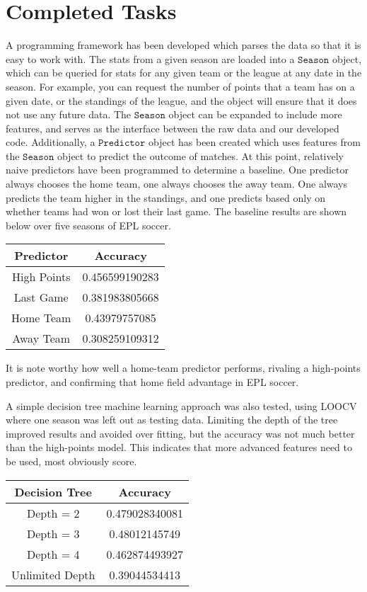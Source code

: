 \documentclass[conference]{IEEEtran}
\begin{document}
\section{Completed Tasks}
A programming framework has been developed which parses the data so that it is easy to work with. The stats from a given season are loaded into a $\mathtt{Season}$ object, which can be queried for stats for any given team or the league at any date in the season. For example, you can request the number of points that a team has on a given date, or the standings of the league, and the object will ensure that it does not use any future data. The $\mathtt{Season}$ object can be expanded to include more features, and serves as the interface between the raw data and our developed code. Additionally, a $\mathtt{Predictor}$ object has been created which uses features from the $\mathtt{Season}$ object to predict the outcome of matches. At this point, relatively naive predictors have been programmed to determine a baseline. One predictor always chooses the home team, one always chooses the away team. One always predicts the team higher in the standings, and one predicts based only on whether teams had won or lost their last game. The baseline results are shown below over five seasons of EPL soccer.

\begin{center}
  \begin{tabular}{@{} cc @{}}
    \hline
    Predictor & Accuracy \\ 
    \hline
High Points & 0.456599190283 \\ 
    Last Game & 0.381983805668\\ 
    Home Team & 0.43979757085 \\ 
    Away Team & 0.308259109312\\ 
    \hline
  \end{tabular}
\end{center}

It is note worthy how well a home-team predictor performs, rivaling a high-points predictor, and confirming that home field advantage in EPL soccer.

A simple decision tree machine learning approach was also tested, using LOOCV where one season was left out as testing data. Limiting the depth of the tree improved results and avoided over fitting, but the accuracy was not much better than the high-points model.  This indicates that more advanced features need to be used, most obviously score.

\begin{center}
  \begin{tabular}{@{} cc @{}}
    \hline
    Decision Tree & Accuracy \\ 
    \hline
Depth = 2 &0.479028340081\\ 
    Depth = 3 & 0.48012145749\\ 
   Depth = 4 & 0.462874493927 \\ 
    Unlimited Depth & 0.39044534413\\ 
    \hline
  \end{tabular}
\end{center}
\end{document}
